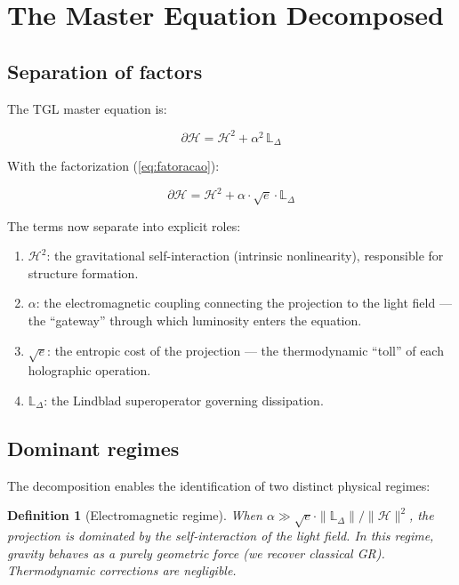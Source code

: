 \documentclass[12pt,a4paper,twoside]{article}
\newtheorem{definition}[theorem]{Definition}
\newcommand{\alphaii}{\alpha^{2}}
\begin{document}
\section{The Master Equation Decomposed}
\label{sec:mestra}

\subsection{Separation of factors}

The TGL master equation \cite{Miguel2026Fronteira} is:

\begin{equation}
\partial\mathcal{H} = \mathcal{H}^2 + \alphaii\,\mathbb{L}_\Delta
\end{equation}

With the factorization (\ref{eq:fatoracao}):

\begin{equationbox}[title={Factored Master Equation}]
\begin{equation}
\boxed{\partial\mathcal{H} = \mathcal{H}^2 + \alpha \cdot \sqrt{e} \cdot \mathbb{L}_\Delta}
\label{eq:mestra_fatorada}
\end{equation}
\end{equationbox}

The terms now separate into explicit roles:

\begin{enumerate}[nosep]
\item $\mathcal{H}^2$: the gravitational self-interaction (intrinsic nonlinearity), responsible for structure formation.
\item $\alpha$: the electromagnetic coupling connecting the projection to the light field --- the ``gateway'' through which luminosity enters the equation.
\item $\sqrt{e}$: the entropic cost of the projection --- the thermodynamic ``toll'' of each holographic operation.
\item $\mathbb{L}_\Delta$: the Lindblad superoperator governing dissipation.
\end{enumerate}

\subsection{Dominant regimes}

The decomposition enables the identification of two distinct physical regimes:

\begin{definition}[Electromagnetic regime]
When $\alpha \gg \sqrt{e} \cdot \|\mathbb{L}_\Delta\|/\|\mathcal{H}\|^2$, the projection is dominated by the self-interaction of the light field. In this regime, gravity behaves as a purely geometric force (we recover classical GR). Thermodynamic corrections are negligible.
\end{definition}
\end{document}
